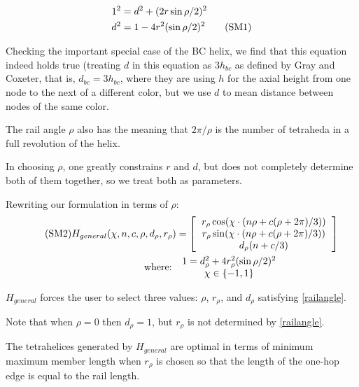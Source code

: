 \documentclass[review]{siamonline1116}
\newcommand\numberthis{\addtocounter{equation}{1}\tag{\theequation}}
\begin{document}
\begin{align*}
  1^2 &= d^2 + (2 r \sin{ \rho / 2})^2 \\
  d^2 &= 1 - 4 r^2 (\sin{ \rho / 2})^2    \numberthis  \label{railangle} \\
\end{align*}

Checking the important special case of the BC helix, we find that this equation
indeed holds true (treating $d$ in this equation as $3 h_{bc}$ as defined by
Gray and Coxeter, that is, $d_{bc} = 3h_{bc}$, where they are using
$h$ for the axial height from one node to
the next of a different color, but we use $d$ to mean distance between nodes of
the  same color.

The rail angle $\rho$ also has the meaning that $2 \pi / \rho$ is the number of
tetraheda in a full revolution of the helix.

In choosing $\rho$, one greatly constrains $r$ and $d$, but does not completely
determine both of them together, so we treat both as parameters.

Rewriting our formulation in terms of $\rho$:
\begin{align*}
\numberthis  \label{eq:general}  
H_{general}(\chi,n,c,\rho,d_{\rho},r_{\rho}) &= 
 \left [
  \begin{tabular}{c}
   $ r_{\rho} \cos(\chi \cdot (n \rho + c(\rho +  2 \pi) /3)) $\\
   $ r_{\rho}  \sin(\chi \cdot (n \rho + c(\rho +  2 \pi) /3)) $\\
   $ d_{\rho} (n + c /3) $
  \end{tabular}
  \right ] \\
\text{where: } &
\begin{tabular}{c}
  $   1 = d_{\rho}^2 + 4 r_{\rho}^2 (\sin{ \rho / 2})^2 $ \\
    $\chi \in \{-1,1\}$ \\  
\end{tabular}
\end{align*} 


$H_{general}$ forces the user to select three values: $\rho$, $r_{\rho}$, and $d_{\rho}$ satisfying \eqref{railangle}.

Note that when $\rho = 0$ then $d_{\rho} = 1$, but $r_{\rho}$ is not determined by
\cref{railangle}.

\begin{theorem}
  \label{generalformulaoptimal}
  The tetrahelices generated by $H_{general}$ are optimal in terms of minimum maximum member length when $r_{\rho}$ is chosen so that
  the length of the one-hop edge is equal to the rail length.
\end{theorem}
\end{document}
